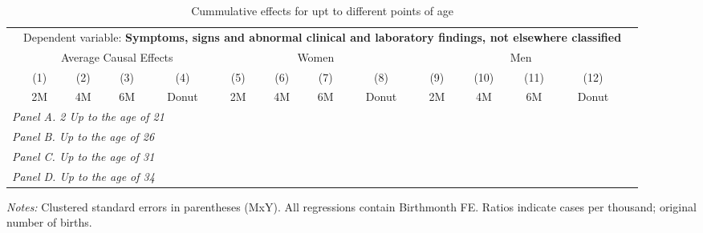  \begin{table}[H] \begin{threeparttable} \centering \caption{Cummulative effects for upt to different points of age} {\def\sym#1{\ifmmode^{#1}\else\(^{#1}\)\fi} \begin{tabular}{l*{13}{c}} \toprule & \multicolumn{12}{c}{Dependent variable: \textbf{Symptoms, signs and abnormal clinical and laboratory findings, not elsewhere classified}} \\ \cmidrule(lr){2-13}
            &\multicolumn{4}{c}{Average Causal Effects}         &\multicolumn{4}{c}{Women}                          &\multicolumn{4}{c}{Men}                            \\\cmidrule(lr){2-5}\cmidrule(lr){6-9}\cmidrule(lr){10-13}
            &\multicolumn{1}{c}{(1)}&\multicolumn{1}{c}{(2)}&\multicolumn{1}{c}{(3)}&\multicolumn{1}{c}{(4)}&\multicolumn{1}{c}{(5)}&\multicolumn{1}{c}{(6)}&\multicolumn{1}{c}{(7)}&\multicolumn{1}{c}{(8)}&\multicolumn{1}{c}{(9)}&\multicolumn{1}{c}{(10)}&\multicolumn{1}{c}{(11)}&\multicolumn{1}{c}{(12)}\\
            &\multicolumn{1}{c}{2M}&\multicolumn{1}{c}{4M}&\multicolumn{1}{c}{6M}&\multicolumn{1}{c}{Donut}&\multicolumn{1}{c}{2M}&\multicolumn{1}{c}{4M}&\multicolumn{1}{c}{6M}&\multicolumn{1}{c}{Donut}&\multicolumn{1}{c}{2M}&\multicolumn{1}{c}{4M}&\multicolumn{1}{c}{6M}&\multicolumn{1}{c}{Donut}\\
\midrule
 \multicolumn{13}{l}{\emph{Panel A. 2 Up to the age of 21}} \\   \midrule\multicolumn{13}{l}{\emph{Panel B. Up to the age of 26}} \\   \midrule\multicolumn{13}{l}{\emph{Panel C. Up to the age of 31}} \\   \midrule\multicolumn{13}{l}{\emph{Panel D. Up to the age of 34}} \\   
\bottomrule \end{tabular} } \begin{tablenotes} \item \scriptsize \emph{Notes:} Clustered standard errors in parentheses (MxY). All regressions contain Birthmonth FE. Ratios indicate cases per thousand; original number of births. \end{tablenotes} \end{threeparttable} \end{table} 
